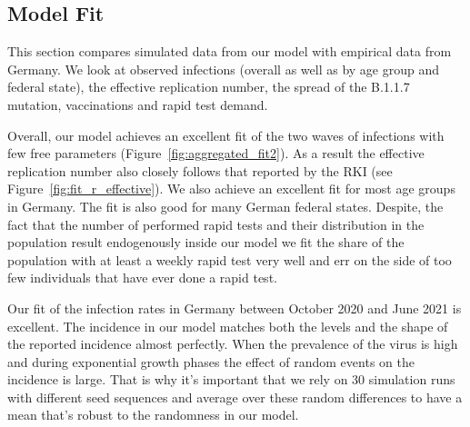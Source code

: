 \subsection{Model Fit}
\label{subsec:fit_results}

This section compares simulated data from our model with empirical data from Germany. We
look at observed infections (overall as well as by age group and federal state), the
effective replication number,  the spread of the B.1.1.7 mutation,
vaccinations and rapid test demand.

Overall, our model achieves an excellent fit of the two waves of infections with few free
parameters (Figure~\ref{fig:aggregated_fit2}). As a result the effective replication
number also closely follows that reported by the RKI (see
Figure~\ref{fig:fit_r_effective}). We also achieve an excellent fit for most age groups
in Germany. The fit is also good for many German federal states. Despite, the fact that
the number of performed rapid tests and their distribution in the population result
endogenously inside our model we fit the share of the population with at least a weekly
rapid test very well and err on the side of too few individuals that have ever done a
rapid test.

Our fit of the infection rates in Germany between October 2020 and June 2021 is
excellent. The incidence in our model matches both the levels and the shape of the
reported incidence almost perfectly. When the prevalence of the virus is high
and during exponential growth phases the effect of random events on the
incidence is large. That is why it's important that we rely on 30 simulation runs with
different seed sequences and average over these random differences to have a mean that's
robust to the randomness in our model.

